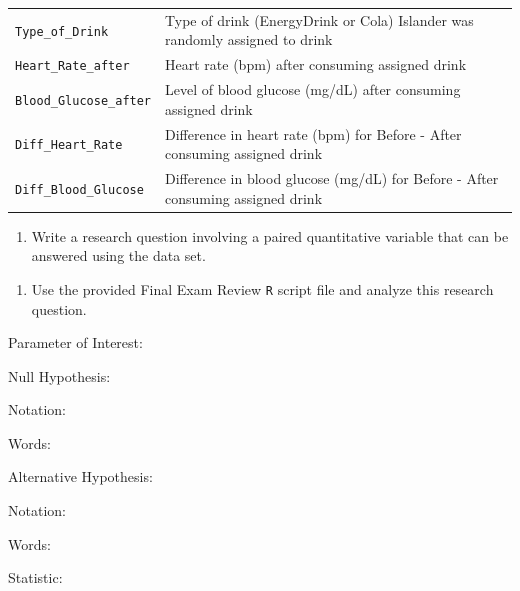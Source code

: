 \documentclass[
]{report}
\providecommand{\tightlist}{%
  \setlength{\itemsep}{0pt}\setlength{\parskip}{0pt}}
\newcommand{\rgi}{\hspace{24pt}}  %
\begin{document}
\begin{longtable}[]{@{}
  >{\raggedright\arraybackslash}p{}
  >{\raggedright\arraybackslash}p{}@{}}
\texttt{Type\_of\_Drink} & Type of drink (EnergyDrink or Cola) Islander was randomly assigned to drink \\
\texttt{Heart\_Rate\_after} & Heart rate (bpm) after consuming assigned drink \\
\texttt{Blood\_Glucose\_after} & Level of blood glucose (mg/dL) after consuming assigned drink \\
\texttt{Diff\_Heart\_Rate} & Difference in heart rate (bpm) for Before - After consuming assigned drink \\
\texttt{Diff\_Blood\_Glucose} & Difference in blood glucose (mg/dL) for Before - After consuming assigned drink \\
\bottomrule
\end{longtable}

\begin{enumerate}
\def\labelenumi{\arabic{enumi}.}
\tightlist
\item
  Write a research question involving a paired quantitative variable that can be answered using the data set.
\end{enumerate}

\vspace{0.8in}

\begin{enumerate}
\def\labelenumi{\arabic{enumi}.}
\setcounter{enumi}{1}
\tightlist
\item
  Use the provided Final Exam Review \texttt{R} script file and analyze this research question.
\end{enumerate}

\rgi Parameter of Interest:

\vspace{0.3in}

\rgi Null Hypothesis:

\rgi \rgi Notation:

\vspace{0.3in}

\rgi \rgi Words:

\vspace{0.5in}

\rgi Alternative Hypothesis:

\rgi \rgi Notation:

\vspace{0.3in}

\rgi \rgi Words:

\vspace{0.5in}

\rgi Statistic:
\end{document}
